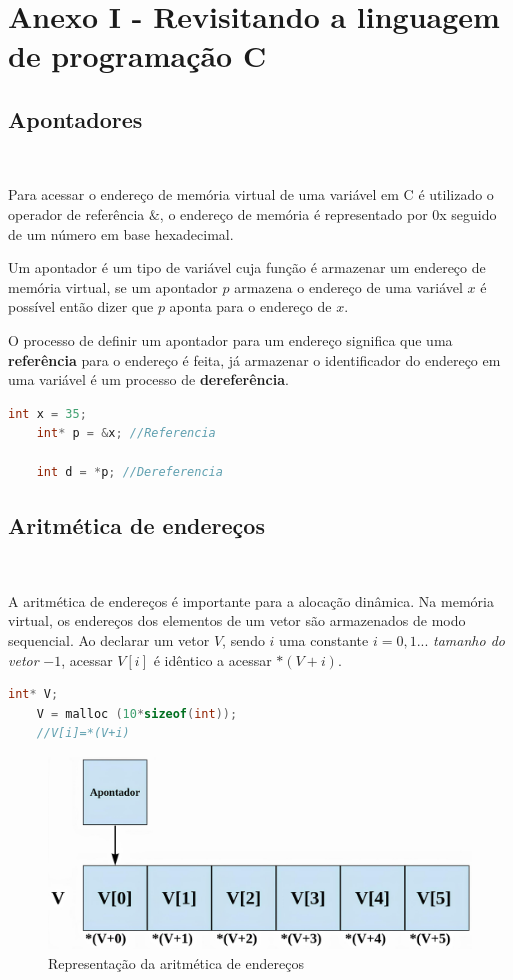 \section*{Anexo I - Revisitando a linguagem de programação C}
\subsection*{Apontadores}
\

Para acessar o endereço de memória virtual de uma variável em C é utilizado o operador de referência $\&$, o endereço de memória é representado por 0x seguido de um número em base hexadecimal.

Um apontador é um tipo de variável cuja função é armazenar um endereço de memória virtual, se um apontador $p$ armazena o endereço de uma variável $x$ é possível então dizer que $p$ aponta para o endereço de $x$.

O processo de definir um apontador para um endereço significa que uma \textbf{referência} para o endereço é feita, já armazenar o identificador do endereço em uma variável é um processo de \textbf{dereferência}.

\begin{lstlisting}[language=C, frame=single]
    int x = 35;
    int* p = &x; //Referencia

    int d = *p; //Dereferencia
\end{lstlisting}

\subsection*{Aritmética de endereços}
\

A aritmética de endereços é importante para a alocação dinâmica. Na memória virtual, os endereços dos elementos de um vetor são armazenados de modo sequencial. Ao declarar um vetor $V$, sendo $i$ uma constante $i=0, 1 ...$ \textit{tamanho do vetor} $-1$, acessar $V[i]$ é idêntico a acessar $*(V+i)$.

\begin{lstlisting}[language=C, frame=single]
    int* V; 
    V = malloc (10*sizeof(int));
    //V[i]=*(V+i)
\end{lstlisting}

\begin{figure}[h]
  \centering
  \includegraphics[width=0.7\linewidth]{img/aritmeticaenderecos.jpg}
    \caption{Representação da aritmética de endereços}
    \label{aritimeticaenderecos}
\end{figure}

